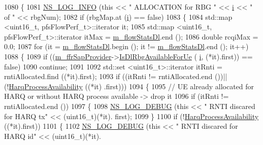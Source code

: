 \begin{DoxyCode}
1080     \{
1081       \hyperlink{group__logging_gafbd73ee2cf9f26b319f49086d8e860fb}{NS\_LOG\_INFO} (\textcolor{keyword}{this} << \textcolor{stringliteral}{" ALLOCATION for RBG "} << \hyperlink{bernuolliDistribution_8m_a6f6ccfcf58b31cb6412107d9d5281426}{i} << \textcolor{stringliteral}{" of "} << rbgNum);
1082       \textcolor{keywordflow}{if} (rbgMap.at (\hyperlink{bernuolliDistribution_8m_a6f6ccfcf58b31cb6412107d9d5281426}{i}) == \textcolor{keyword}{false})
1083         \{
1084           std::map <uint16\_t, pfsFlowPerf\_t>::iterator it;
1085           std::map <uint16\_t, pfsFlowPerf\_t>::iterator itMax = \hyperlink{classns3_1_1PfFfMacScheduler_a00b148349167b85ab9170570e2530b92}{m\_flowStatsDl}.end ();
1086           \textcolor{keywordtype}{double} rcqiMax = 0.0;
1087           \textcolor{keywordflow}{for} (it = \hyperlink{classns3_1_1PfFfMacScheduler_a00b148349167b85ab9170570e2530b92}{m\_flowStatsDl}.begin (); it != \hyperlink{classns3_1_1PfFfMacScheduler_a00b148349167b85ab9170570e2530b92}{m\_flowStatsDl}.end (); it++)
1088             \{
1089               \textcolor{keywordflow}{if} ((\hyperlink{classns3_1_1PfFfMacScheduler_a40519746bd3f39a4b664db3036f2e3fd}{m\_ffrSapProvider}->\hyperlink{classns3_1_1LteFfrSapProvider_a91f4de3c794d2a32fae5bcfafd88b6fa}{IsDlRbgAvailableForUe} (
      \hyperlink{bernuolliDistribution_8m_a6f6ccfcf58b31cb6412107d9d5281426}{i}, (*it).first)) == \textcolor{keyword}{false})
1090                 \textcolor{keywordflow}{continue};
1091 
1092               std::set <uint16\_t>::iterator itRnti = rntiAllocated.find ((*it).first);
1093               \textcolor{keywordflow}{if} ((itRnti != rntiAllocated.end ())||(!\hyperlink{classns3_1_1PfFfMacScheduler_abe0908df952c152cd48cc185e6ea1272}{HarqProcessAvailability} ((*it)
      .first)))
1094                 \{
1095                   \textcolor{comment}{// UE already allocated for HARQ or without HARQ process available -> drop it}
1096                   \textcolor{keywordflow}{if} (itRnti != rntiAllocated.end ())
1097                     \{
1098                       \hyperlink{group__logging_ga413f1886406d49f59a6a0a89b77b4d0a}{NS\_LOG\_DEBUG} (\textcolor{keyword}{this} << \textcolor{stringliteral}{" RNTI discared for HARQ tx"} << (uint16\_t)(*it).
      first);
1099                     \}
1100                   \textcolor{keywordflow}{if} (!\hyperlink{classns3_1_1PfFfMacScheduler_abe0908df952c152cd48cc185e6ea1272}{HarqProcessAvailability} ((*it).first))
1101                     \{
1102                       \hyperlink{group__logging_ga413f1886406d49f59a6a0a89b77b4d0a}{NS\_LOG\_DEBUG} (\textcolor{keyword}{this} << \textcolor{stringliteral}{" RNTI discared for HARQ id"} << (uint16\_t)(*it).

\end{DoxyCode}
